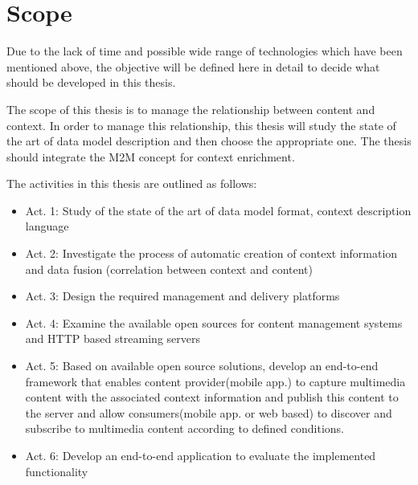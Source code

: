 \section{Scope\label{sec:scope}}

Due to the lack of time and possible wide range of technologies which have been mentioned above, the objective will be defined here in detail to decide what should be developed in this thesis.

The scope of this thesis is to manage the relationship between content and context. In order to manage this relationship, this thesis will study the state of the art of data model description and then choose the appropriate one. The thesis should integrate the \ac{M2M} concept for context enrichment.


The activities in this thesis are outlined as follows:
	\begin{itemize}
		\item Act. 1: Study of the state of the art of data model format, context description language
				\vspace{-0.1in} 
				\vspace{-0.1in} 
		\item Act. 2: Investigate the process of automatic creation of context information and data fusion (correlation between context and content)
				\vspace{-0.1in} 		
		\item Act. 3: Design the required management and delivery platforms 
    			\vspace{-0.1in} 
		\item Act. 4: Examine the available open sources for content management systems and \ac{HTTP} based streaming servers
 				\vspace{-0.1in} 
		\item Act. 5: Based on available open source solutions, develop an end-to-end framework that enables content provider(mobile app.) to capture multimedia content with the associated context information and publish this content to the server and allow consumers(mobile app. or web based) to discover and subscribe to multimedia content according to defined conditions. 
    			\vspace{-0.1in} 
    	\item Act. 6: Develop an end-to-end application to evaluate the implemented functionality
    \end{itemize}

